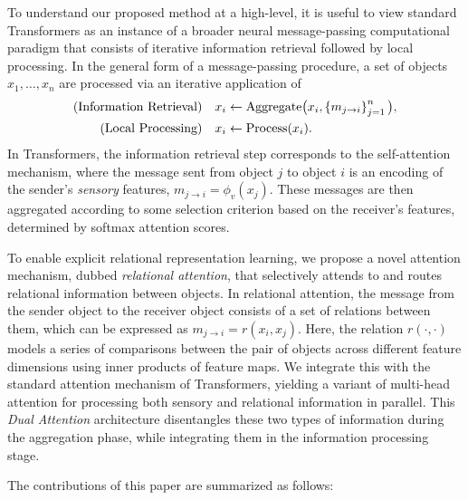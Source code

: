 To understand our proposed method at a high-level, it is useful to view standard Transformers as an instance of a broader neural message-passing computational paradigm that consists of iterative information retrieval followed by local processing. In the general form of a message-passing procedure, a set of objects $x_1,\ldots, x_n$ are processed via an iterative application of
\begin{equation}\label{eq:intro_message_passing}
  \begin{split}
    \text{(Information Retrieval)} \quad x_i &\gets \mathrm{Aggregate}\big(x_i, \left\{m_{j \to i}\right\}_{j=1}^{n}\big), \\
    \text{(Local Processing)} \quad x_i &\gets \mathrm{Process}(x_i).
  \end{split}
\end{equation}
In Transformers, the information retrieval step corresponds to the self-attention mechanism, where the message sent from object $j$ to object $i$ is an encoding of the sender's \textit{sensory} features, $m_{j \to i} = \phi_v(x_j)$. These messages are then aggregated according to some selection criterion based on the receiver's features, determined by softmax attention scores.

To enable explicit relational representation learning, we propose a novel attention mechanism, dubbed \textit{relational attention}, that selectively attends to and routes relational information between objects. In relational attention, the message from the sender object to the receiver object consists of a set of relations between them, which can be expressed as $m_{j \to i} = r(x_i, x_j)$. Here, the relation $r(\cdot, \cdot)$ models a series of comparisons between the pair of objects across different feature dimensions using inner products of feature maps. We integrate this with the standard attention mechanism of Transformers, yielding a variant of multi-head attention for processing both sensory and relational information in parallel. This \textit{Dual Attention} architecture disentangles these two types of information during the aggregation phase, while integrating them in the information processing stage.

The contributions of this paper are summarized as follows:

